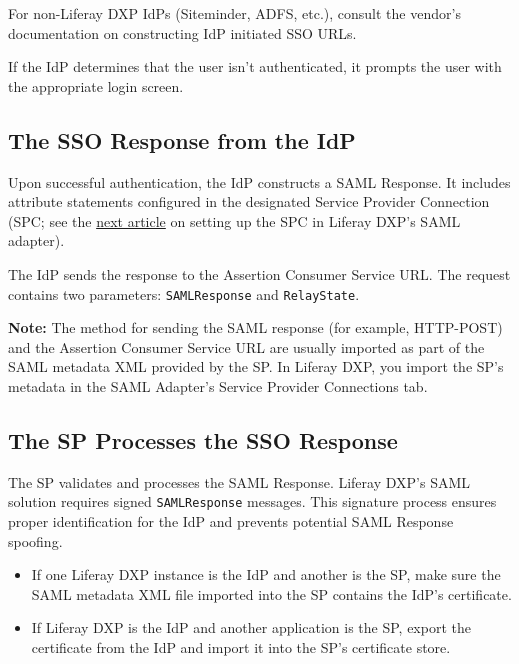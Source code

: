 For non-Liferay DXP IdPs (Siteminder, ADFS, etc.), consult the vendor's
documentation on constructing IdP initiated SSO URLs.

If the IdP determines that the user isn't authenticated, it prompts the
user with the appropriate login screen.

\subsection{The SSO Response from the
IdP}\label{the-sso-response-from-the-idp}

Upon successful authentication, the IdP constructs a SAML Response. It
includes attribute statements configured in the designated Service
Provider Connection (SPC; see the
\href{/docs/7-2/deploy/-/knowledge_base/d/setting-up-liferay-as-a-saml-identity-provider}{next
article} on setting up the SPC in Liferay DXP's SAML adapter).

The IdP sends the response to the Assertion Consumer Service URL. The
request contains two parameters: \texttt{SAMLResponse} and
\texttt{RelayState}.

\noindent\hrulefill

\textbf{Note:} The method for sending the SAML response (for example,
HTTP-POST) and the Assertion Consumer Service URL are usually imported
as part of the SAML metadata XML provided by the SP. In Liferay DXP, you
import the SP's metadata in the SAML Adapter's Service Provider
Connections tab.

\noindent\hrulefill

\subsection{The SP Processes the SSO
Response}\label{the-sp-processes-the-sso-response}

The SP validates and processes the SAML Response. Liferay DXP's SAML
solution requires signed \texttt{SAMLResponse} messages. This signature
process ensures proper identification for the IdP and prevents potential
SAML Response spoofing.

\begin{itemize}
\tightlist
\item
  If one Liferay DXP instance is the IdP and another is the SP, make
  sure the SAML metadata XML file imported into the SP contains the
  IdP's certificate.
\item
  If Liferay DXP is the IdP and another application is the SP, export
  the certificate from the IdP and import it into the SP's certificate
  store.
\end{itemize}

